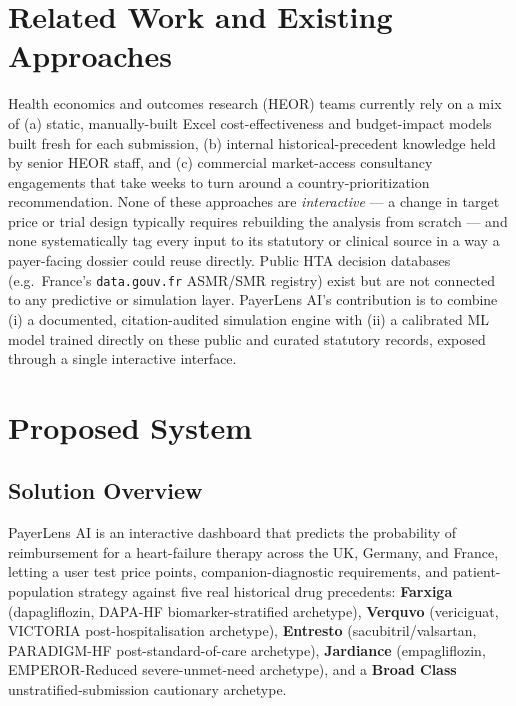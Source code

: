 \documentclass[11pt,a4paper]{article}
\begin{document}
\section{Related Work and Existing Approaches}
Health economics and outcomes research (HEOR) teams currently rely on a mix of (a) static,
manually-built Excel cost-effectiveness and budget-impact models built fresh for each submission,
(b) internal historical-precedent knowledge held by senior HEOR staff, and (c) commercial
market-access consultancy engagements that take weeks to turn around a country-prioritization
recommendation. None of these approaches are \emph{interactive} --- a change in target price or
trial design typically requires rebuilding the analysis from scratch --- and none systematically
tag every input to its statutory or clinical source in a way a payer-facing dossier could reuse
directly. Public HTA decision databases (e.g.\ France's \texttt{data.gouv.fr} ASMR/SMR registry)
exist but are not connected to any predictive or simulation layer. PayerLens AI's contribution is
to combine (i) a documented, citation-audited simulation engine with (ii) a calibrated ML model
trained directly on these public and curated statutory records, exposed through a single
interactive interface.

\section{Proposed System}

\subsection{Solution Overview}
PayerLens AI is an interactive dashboard that predicts the probability of reimbursement for a
heart-failure therapy across the UK, Germany, and France, letting a user test price points,
companion-diagnostic requirements, and patient-population strategy against five real historical
drug precedents: \textbf{Farxiga} (dapagliflozin, DAPA-HF biomarker-stratified archetype),
\textbf{Verquvo} (vericiguat, VICTORIA post-hospitalisation archetype), \textbf{Entresto}
(sacubitril/valsartan, PARADIGM-HF post-standard-of-care archetype), \textbf{Jardiance}
(empagliflozin, EMPEROR-Reduced severe-unmet-need archetype), and a \textbf{Broad Class}
unstratified-submission cautionary archetype.
\end{document}
